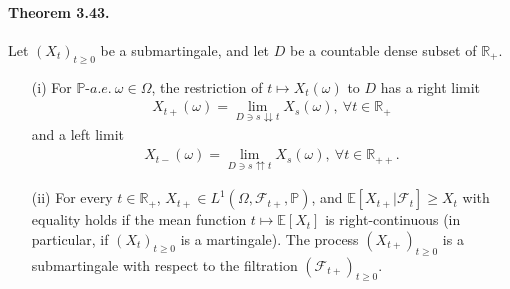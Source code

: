 \documentclass{article}
\numberwithin{equation}{section}
\newcommand{\E}{\mathbb{E}}
\renewcommand{\P}{\mathbb{P}}
\theoremstyle{plain}
\theoremstyle{definition}
\begin{document}
\paragraph{Theorem 3.43.\label{thm:3.43}} Let $(X_t)_{t\geq 0}$ be a submartingale, and let $D$ be a countable dense
subset of $\mathbb{R}_+$.
\begin{itemize}
\item[(i)] For $\P$-$a.e.\ \omega\in\Omega$, the restriction of $t\mapsto X_t(\omega)$ to $D$ has a right limit
\begin{align*}
	X_{t+}(\omega)=\lim_{D\ni s\downdownarrows t} X_s(\omega),\ \forall t\in\mathbb{R}_+
\end{align*}
and a left limit
\begin{align*}
	X_{t-}(\omega)=\lim_{D\ni s\upuparrows t} X_s(\omega),\ \forall t\in\mathbb{R}_{++}.
\end{align*}
\item[(ii)] For every $t\in\mathbb{R}_+$, $X_{t+}\in L^1(\Omega,\mathscr{F}_{t+},\P)$, and $\E[X_{t+}|\mathscr{F}_t]\geq X_t$ with equality holds if the mean function $t\mapsto\E[X_t]$ is right-continuous (in particular, if $(X_t)_{t\geq 0}$ is a martingale). The process $(X_{t+})_{t\geq 0}$ is a submartingale with respect to the filtration $(\mathscr{F}_{t+})_{t\geq 0}$.
\end{itemize}
\end{document}
